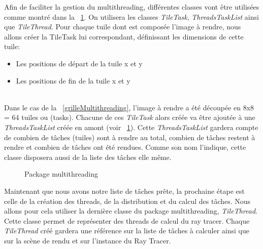 \documentclass[11pt]{article}
\begin{document}
Afin de faciliter la gestion du multithreading, différentes classes vont être utilisées comme montré dans la \figurename\ \ref{packageMultithreading}. On utilisera les classes \textit{TileTask}, \textit{ThreadsTaskList} ainsi que \textit{TileThread}. Pour chaque tuile dont est composée l'image à rendre, nous allons créer la TileTask lui correspondant, définissant les dimensions de cette tuile:
\begin{itemize}
	\item {Les positions de départ de la tuile x et y}
	\item {Les positions de fin de la tuile x et y}
\end{itemize}
\hfill\\
Dans le cas de la \figurename\ \ref{grilleMultithreading}, l'image à rendre a été découpée en 8x8 = 64 tuiles ou (tasks). Chacune de ces \textit{TileTask} alors créée va être ajoutée à une \textit{ThreadsTaskList} créée en amont (voir \figurename\ \ref{packageMultithreading}). Cette \textit{ThreadsTaskList} gardera compte de combien de tâches (tuiles) sont à rendre au total, combien de tâches restent à rendre et combien de tâches ont été rendues. Comme son nom l'indique, cette classe disposera aussi de la liste des tâches elle même.

\begin{figure}[h!]

	\caption{Package multithreading}
	\label{packageMultithreading}
\end{figure}
\FloatBarrier

Maintenant que nous avons notre liste de tâches prête, la prochaine étape est celle de la création des threads, de la distribution et du calcul des tâches. Nous allons pour cela utiliser la dernière classe du package multithreading, \textit{TileThread}. Cette classe permet de représenter des threads de calcul du ray tracer. Chaque \textit{TileThread} créé gardera une référence sur la liste de tâches à calculer ainsi que sur la scène de rendu et sur l'instance du Ray Tracer.
\end{document}
